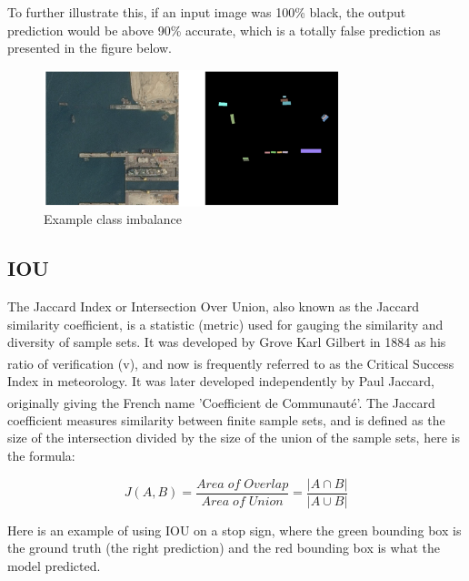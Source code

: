 To further illustrate this, if an input image was 100\% black, the output prediction would be above 90\% accurate, which is a totally false prediction as presented in the figure below.

\vspace{0.1in}

\begin{figure}[H]
\centering
  \vspace{-0.1in}
    \centerline{\includegraphics[width = 3.4in]{../images/class_imbalance.png}}
    \caption{Example class imbalance}
\end{figure}

\subsection{IOU}
\hspace{\parindent}
The Jaccard Index or Intersection Over Union, also known as the Jaccard similarity coefficient, is a statistic (metric) used for gauging the similarity and diversity of sample sets. It was developed by Grove Karl Gilbert in 1884 as his ratio of verification (v),\textsuperscript{\cite{murphy1996finley}} and now is frequently referred to as the Critical Success Index in meteorology. It was later developed independently by Paul Jaccard, originally giving the French name 'Coefficient de Communauté'. \textsuperscript{\cite{jaccard1912distribution}} The Jaccard coefficient measures similarity between finite sample sets, and is defined as the size of the intersection divided by the size of the union of the sample sets, here is the formula:

\begin{equation}
    J(A,B) = \frac{Area\; of\; Overlap}{Area\; of\; Union} = \frac{|A \cap B|}{|A \cup B|}
\end{equation}

Here is an example of using IOU on a stop sign, where the green bounding box is the ground truth (the right prediction) and the red bounding box is what the model predicted.

\vspace{0.1in}

